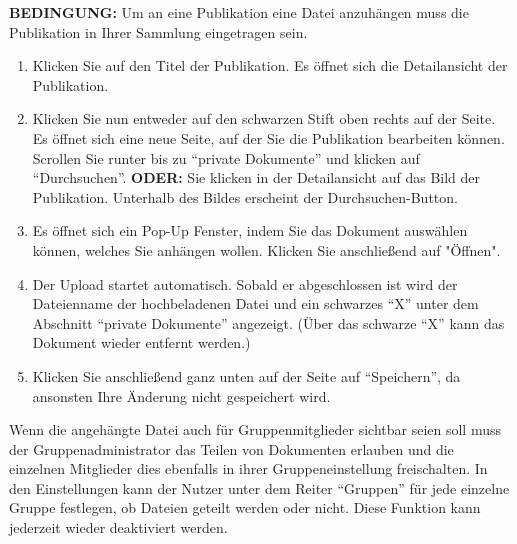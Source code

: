 \documentclass[b5paper,11pt,twoside]{scrbook} %
\begin{document}
\begin{shaded} \centering\textbf{BEDINGUNG:} Um an eine Publikation eine Datei anzuhängen muss die Publikation in Ihrer Sammlung eingetragen sein.\end{shaded}
\begin{enumerate}
    \item Klicken Sie auf den Titel der Publikation. Es öffnet sich die Detailansicht der Publikation.
    \item Klicken Sie nun entweder auf den schwarzen Stift oben rechts auf der Seite. Es öffnet sich eine neue Seite, auf der Sie die Publikation bearbeiten können. Scrollen Sie runter bis zu \enquote{private Dokumente} und klicken auf \enquote{Durchsuchen}. \newline \textbf{ODER:} Sie klicken in der Detailansicht auf das Bild der Publikation. Unterhalb des Bildes erscheint der Durchsuchen-Button. 
    \item Es öffnet sich ein Pop-Up Fenster, indem Sie das Dokument auswählen können, welches Sie anhängen wollen. Klicken Sie anschließend auf "Öffnen".
    \item Der Upload startet automatisch. Sobald er abgeschlossen ist wird der Dateienname der hochbeladenen Datei und ein schwarzes \enquote{X} unter dem Abschnitt \enquote{private Dokumente} angezeigt. (Über das schwarze \enquote{X} kann das Dokument wieder entfernt werden.)
    \item Klicken Sie anschließend ganz unten auf der Seite auf \enquote{Speichern}, da ansonsten Ihre Änderung nicht gespeichert wird.
\end{enumerate}
Wenn die angehängte Datei auch für Gruppenmitglieder sichtbar seien soll muss der  Gruppenadministrator das Teilen von Dokumenten erlauben
und die einzelnen Mitglieder dies ebenfalls in ihrer Gruppeneinstellung freischalten. In den Einstellungen kann der Nutzer unter dem Reiter \enquote{Gruppen} für jede einzelne Gruppe festlegen, ob Dateien geteilt werden oder nicht. Diese Funktion kann jederzeit wieder deaktiviert werden.
\end{document}
